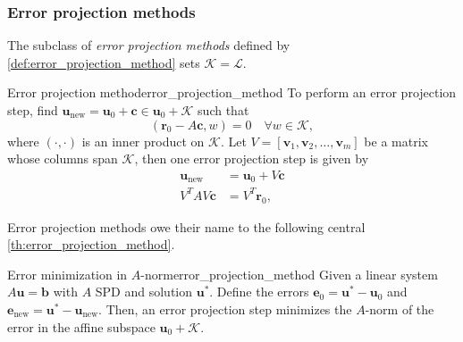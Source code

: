 \subsubsection{Error projection methods}
The subclass of \textit{error projection methods} defined by \cref{def:error_projection_method} sets $\mathcal{K} = \mathcal{L}$.
\begin{fancydef}{Error projection method}{error_projection_method}
  To perform an error projection step, find $\mathbf{u}_{\text{new}} = \mathbf{u}_0 + \mathbf{c} \in \mathbf{u}_0 + \mathcal{K}$ such that
  \begin{equation}
    (\mathbf{r}_0 - A\mathbf{c}, w) = 0 \quad \forall w \in \mathcal{K},
    \label{eq:orthogonality_condition}
  \end{equation}
  where $(\cdot,\cdot)$ is an inner product on $\mathcal{K}$. Let $V = [\mathbf{v}_1, \mathbf{v}_2, \dots, \mathbf{v}_m]$ be a matrix whose columns span $\mathcal{K}$, then one error projection step is given by
  \begin{align*}
    \mathbf{u}_{\text{new}} & = \mathbf{u}_0 + V \mathbf{c} \\
    V^TAV\mathbf{c} & = V^T\mathbf{r}_0,
  \end{align*}
\end{fancydef}
Error projection methods owe their name to the following central \cref{th:error_projection_method}.
\begin{fancyth}{Error minimization in $A$-norm}{error_projection_method}
  Given a linear system $A\mathbf{u} = \mathbf{b}$ with $A$ SPD and solution $\mathbf{u}^{*}$. Define the errors $\mathbf{e}_0 = \mathbf{u}^{*} - \mathbf{u}_0$ and $\mathbf{e}_{\text{new}} = \mathbf{u}^{*} - \mathbf{u}_{\text{new}}$. Then, an error projection step minimizes the $A$-norm of the error in the affine subspace $\mathbf{u}_0 + \mathcal{K}$.
\end{fancyth}
